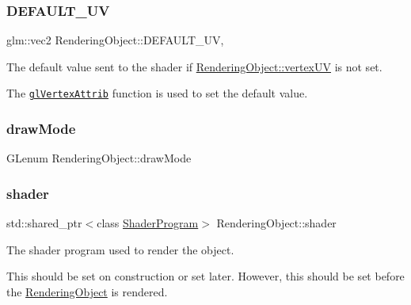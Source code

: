 \subsubsection{\texorpdfstring{D\+E\+F\+A\+U\+L\+T\+\_\+\+UV}{DEFAULT\_UV}}
{\footnotesize\ttfamily glm\+::vec2 Rendering\+Object\+::\+D\+E\+F\+A\+U\+L\+T\+\_\+\+UV\hspace{0.3cm}{\ttfamily [static]}, {\ttfamily [protected]}}



The default value sent to the shader if \hyperlink{class_rendering_object_afc405316bddec4ba1d5c228ecc0d9061}{Rendering\+Object\+::vertex\+UV} is not set. 

The \href{https://www.opengl.org/sdk/docs/man/html/glVertexAttrib.xhtml}{\tt gl\+Vertex\+Attrib} function is used to set the default value. \hypertarget{class_rendering_object_aa67856a72705b54a5667e91e270d00b3}{}\label{class_rendering_object_aa67856a72705b54a5667e91e270d00b3} 
\subsubsection{\texorpdfstring{draw\+Mode}{drawMode}}
{\footnotesize\ttfamily G\+Lenum Rendering\+Object\+::draw\+Mode\hspace{0.3cm}{\ttfamily [protected]}}

\hypertarget{class_rendering_object_ae50e545ce2008ffa802478cd4316e82e}{}\label{class_rendering_object_ae50e545ce2008ffa802478cd4316e82e} 
\subsubsection{\texorpdfstring{shader}{shader}}
{\footnotesize\ttfamily std\+::shared\+\_\+ptr$<$class \hyperlink{class_shader_program}{Shader\+Program}$>$ Rendering\+Object\+::shader\hspace{0.3cm}{\ttfamily [protected]}}



The shader program used to render the object. 

This should be set on construction or set later. However, this should be set before the \hyperlink{class_rendering_object}{Rendering\+Object} is rendered. \hypertarget{class_rendering_object_a96dd05670a977a949514a2c490c1c867}{}\label{class_rendering_object_a96dd05670a977a949514a2c490c1c867} 
